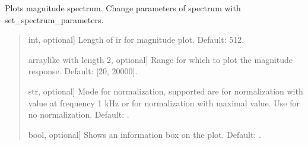 \documentclass[letterpaper,10pt,english]{sphinxmanual}
\begin{document}
\begin{fulllineitems}
\begin{fulllineitems}
\label{\detokenize{classes:dsptoolbox.classes.filter_class.Filter.plot_magnitude}}
\pysigstartsignatures
{}
\pysigstopsignatures
\sphinxAtStartPar
Plots magnitude spectrum.
Change parameters of spectrum with set\_spectrum\_parameters.
\begin{quote}\begin{description}
\begin{description}
\sphinxlineitem{\sphinxstylestrong{length\_samples}}{[}int, optional{]}
\sphinxAtStartPar
Length of ir for magnitude plot. Default: 512.

\sphinxlineitem{\sphinxstylestrong{range\_hz}}{[}array\sphinxhyphen{}like with length 2, optional{]}
\sphinxAtStartPar
Range for which to plot the magnitude response.
Default: {[}20, 20000{]}.

\sphinxlineitem{\sphinxstylestrong{normalize}}{[}str, optional{]}
\sphinxAtStartPar
Mode for normalization, supported are  for normalization
with value at frequency 1 kHz or  for normalization with
maximal value. Use  for no normalization. Default: .

\sphinxlineitem{\sphinxstylestrong{show\_info\_box}}{[}bool, optional{]}
\sphinxAtStartPar
Shows an information box on the plot. Default: .


\end{description}
\end{description}
\end{quote}
\end{fulllineitems}
\end{fulllineitems}
\end{document}
